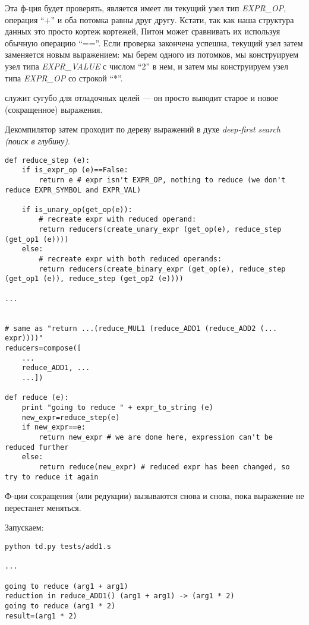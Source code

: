 Эта ф-ция будет проверять, является имеет ли текущий узел тип \textit{EXPR\_OP},
операция ``+'' и оба потомка равны друг другу.
Кстати, так как наша структура данных это просто кортеж кортежей, Питон может сравнивать их используя обычную
операцию ``==''.
Если проверка закончена успешна, текущий узел затем заменяется новым выражением:
мы берем одного из потомков, мы конструируем узел типа \textit{EXPR\_VALUE} с числом ``2'' в нем,
и затем мы конструируем узел типа \textit{EXPR\_OP} со строкой ``*''.

 служит сугубо для отладочных целей --- он просто выводит старое и новое (сокращенное) выражения.

Декомпилятор затем проходит по дереву выражений в духе 
\textit{deep-first search (поиск в глубину)}.

\begin{lstlisting}
def reduce_step (e):
    if is_expr_op (e)==False:
        return e # expr isn't EXPR_OP, nothing to reduce (we don't reduce EXPR_SYMBOL and EXPR_VAL)

    if is_unary_op(get_op(e)):
        # recreate expr with reduced operand:
        return reducers(create_unary_expr (get_op(e), reduce_step (get_op1 (e))))
    else:
        # recreate expr with both reduced operands:
        return reducers(create_binary_expr (get_op(e), reduce_step (get_op1 (e)), reduce_step (get_op2 (e))))

...


# same as "return ...(reduce_MUL1 (reduce_ADD1 (reduce_ADD2 (... expr))))"
reducers=compose([
	...
    reduce_ADD1, ...
    ...])

def reduce (e):
    print "going to reduce " + expr_to_string (e)
    new_expr=reduce_step(e)
    if new_expr==e:
        return new_expr # we are done here, expression can't be reduced further
    else:
        return reduce(new_expr) # reduced expr has been changed, so try to reduce it again
\end{lstlisting}

Ф-ции сокращения (или редукции) вызываются снова и снова, пока выражение не перестанет меняться.

Запускаем:

\begin{lstlisting}
python td.py tests/add1.s

...

going to reduce (arg1 + arg1)
reduction in reduce_ADD1() (arg1 + arg1) -> (arg1 * 2)
going to reduce (arg1 * 2)
result=(arg1 * 2)
\end{lstlisting}

